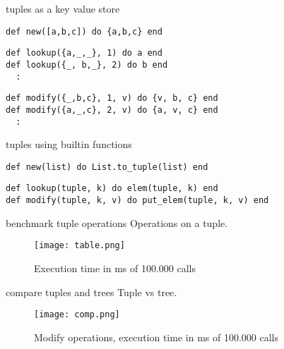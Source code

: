 \begin{frame}[fragile]{tuples as a key value store}

\begin{verbatim}
def new([a,b,c]) do {a,b,c} end
\end{verbatim}
\pause
\begin{verbatim}
def lookup({a,_,_}, 1) do a end
def lookup({_, b,_}, 2) do b end
  :
\end{verbatim}
\pause
\begin{verbatim}
def modify({_,b,c}, 1, v) do {v, b, c} end
def modify({a,_,c}, 2, v) do {a, v, c} end
  :

\end{verbatim}

\end{frame}

\begin{frame}[fragile]{tuples using builtin functions}

  
\begin{verbatim}
def new(list) do List.to_tuple(list) end
\end{verbatim}
\pause
\begin{verbatim}
def lookup(tuple, k) do elem(tuple, k) end  
def modify(tuple, k, v) do put_elem(tuple, k, v) end
\end{verbatim}
\pause


\end{frame}


\begin{frame}{benchmark tuple operations}
 Operations on a tuple.
 \begin{figure}
  \centering
  \texttt{[image: table.png]}
  \caption{Execution time in ms of 100.000 calls}
 \end{figure}

\end{frame}



\begin{frame}{compare tuples and trees}
 Tuple vs tree.
 \begin{figure}
  \centering
  \texttt{[image: comp.png]}
  \caption{Modify operations, execution time in ms of 100.000 calls}
 \end{figure}

\end{frame}

